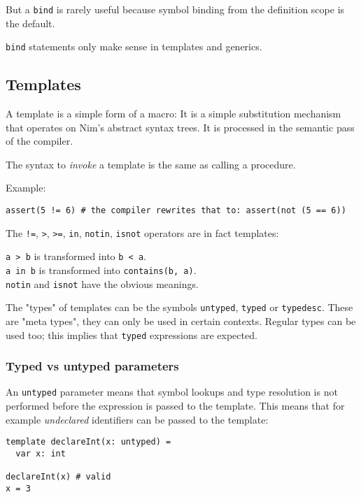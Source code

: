 But a \texttt{bind} is rarely useful because symbol binding from the
definition scope is the default.

\texttt{bind} statements only make sense in templates and generics.

\hypertarget{templates}{%
\subsection{Templates}\label{templates}}

A template is a simple form of a macro: It is a simple substitution
mechanism that operates on Nim's abstract syntax trees. It is processed
in the semantic pass of the compiler.

The syntax to \emph{invoke} a template is the same as calling a
procedure.

Example:

\begin{verbatim}
assert(5 != 6) # the compiler rewrites that to: assert(not (5 == 6))
\end{verbatim}

The \texttt{!=}, \texttt{\textgreater{}}, \texttt{\textgreater{}=},
\texttt{in}, \texttt{notin}, \texttt{isnot} operators are in fact
templates:

\texttt{a\ \textgreater{}\ b} is transformed into
\texttt{b\ \textless{}\ a}.\\
\texttt{a\ in\ b} is transformed into \texttt{contains(b,\ a)}.\\
\texttt{notin} and \texttt{isnot} have the obvious meanings.

The "types" of templates can be the symbols \texttt{untyped},
\texttt{typed} or \texttt{typedesc}. These are "meta types", they can
only be used in certain contexts. Regular types can be used too; this
implies that \texttt{typed} expressions are expected.

\hypertarget{typed-vs-untyped-parameters}{%
\subsubsection{Typed vs untyped
parameters}\label{typed-vs-untyped-parameters}}

An \texttt{untyped} parameter means that symbol lookups and type
resolution is not performed before the expression is passed to the
template. This means that for example \emph{undeclared} identifiers can
be passed to the template:

\begin{verbatim}
template declareInt(x: untyped) =
  var x: int

declareInt(x) # valid
x = 3
\end{verbatim}

